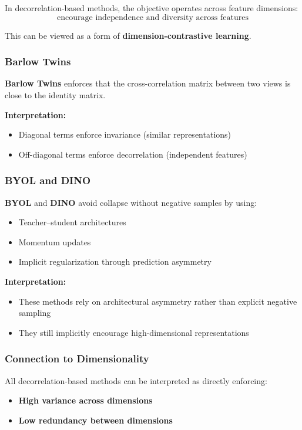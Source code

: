 \documentclass{article}
\begin{document}
In decorrelation-based methods, the objective operates across feature dimensions:
\[
\text{encourage independence and diversity across features}
\]

This can be viewed as a form of \textbf{dimension-contrastive learning}.

\subsubsection*{Barlow Twins}

\textbf{Barlow Twins} enforces that the cross-correlation matrix between two views is close to the identity matrix.

\textbf{Interpretation:}
\begin{itemize}
\item Diagonal terms enforce invariance (similar representations)
\item Off-diagonal terms enforce decorrelation (independent features)
\end{itemize}

\subsubsection*{BYOL and DINO}

\textbf{BYOL} and \textbf{DINO} avoid collapse without negative samples by using:
\begin{itemize}
\item Teacher–student architectures
\item Momentum updates
\item Implicit regularization through prediction asymmetry
\end{itemize}

\textbf{Interpretation:}
\begin{itemize}
\item These methods rely on architectural asymmetry rather than explicit negative sampling
\item They still implicitly encourage high-dimensional representations
\end{itemize}

\subsubsection*{Connection to Dimensionality}

All decorrelation-based methods can be interpreted as directly enforcing:

\begin{itemize}
\item \textbf{High variance across dimensions}
\item \textbf{Low redundancy between dimensions}
\end{itemize}
\end{document}
